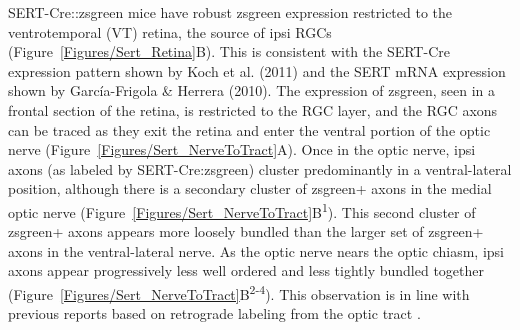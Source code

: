 SERT-Cre::zsgreen mice have robust zsgreen expression restricted to the ventrotemporal (VT) retina, the source of ipsi RGCs (Figure~\ref{Figures/Sert_Retina}B).
This is consistent with the SERT-Cre expression pattern shown by Koch et al. (2011) and the SERT mRNA expression shown by Garc\'ia-Frigola \& Herrera (2010).
The expression of zsgreen, seen in a frontal section of the retina, is restricted to the RGC layer, and the RGC axons can be traced as they exit the retina and enter the ventral portion of the optic nerve (Figure~\ref{Figures/Sert_NerveToTract}A).
Once in the optic nerve, ipsi axons (as labeled by SERT-Cre:zsgreen) cluster predominantly in a ventral-lateral position, although there is a secondary cluster of zsgreen+ axons in the medial optic nerve (Figure~\ref{Figures/Sert_NerveToTract}B\textsuperscript{1}).
This second cluster of zsgreen+ axons appears more loosely bundled than the larger set of zsgreen+ axons in the ventral-lateral nerve.
As the optic nerve nears the optic chiasm, ipsi axons appear progressively less well ordered and less tightly bundled together (Figure~\ref{Figures/Sert_NerveToTract}B\textsuperscript{2-4}).
This observation is in line with previous reports based on retrograde labeling from the optic tract \cite{colello1990early}.

